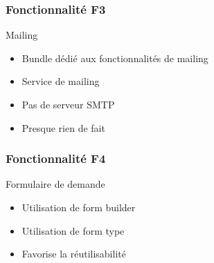 \speaker{\Florian}

\begin{frame}
\frametitle{Fonctionnalité F3}
\begin{block}{Mailing}
	\begin{itemize}
		\item Bundle dédié aux fonctionnalités de mailing
		\item Service de mailing
		\item Pas de serveur SMTP
		\item Presque rien de fait
	\end{itemize}
\end{block}
\end{frame}

\begin{frame}
\frametitle{Fonctionnalité F4}
\begin{block}{Formulaire de demande}
	\begin{itemize}
		\item Utilisation de form builder
		\item Utilisation de form type
		\item Favorise la réutilisabilité
	\end{itemize}
\end{block}
\end{frame}